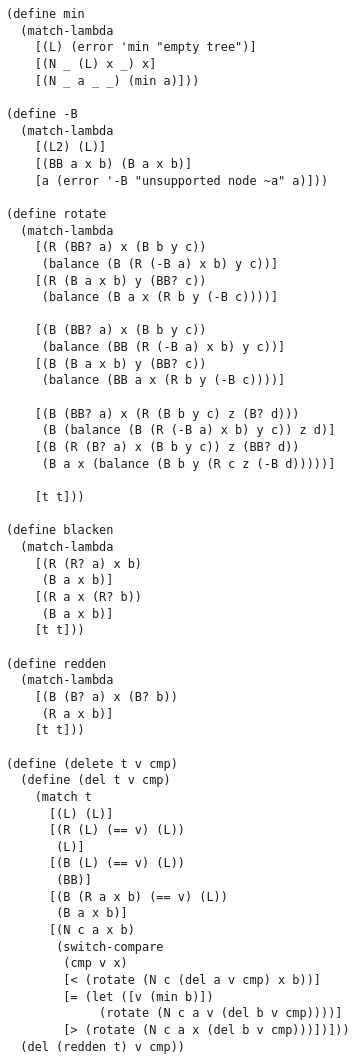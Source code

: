 \documentclass[preprint]{sigplanconf}
\begin{document}
\begin{verbatim}
(define min
  (match-lambda
    [(L) (error 'min "empty tree")]
    [(N _ (L) x _) x]
    [(N _ a _ _) (min a)]))

(define -B
  (match-lambda
    [(L2) (L)]
    [(BB a x b) (B a x b)]
    [a (error '-B "unsupported node ~a" a)]))

(define rotate
  (match-lambda
    [(R (BB? a) x (B b y c))
     (balance (B (R (-B a) x b) y c))]
    [(R (B a x b) y (BB? c))
     (balance (B a x (R b y (-B c))))]
    
    [(B (BB? a) x (B b y c))
     (balance (BB (R (-B a) x b) y c))]
    [(B (B a x b) y (BB? c))
     (balance (BB a x (R b y (-B c))))]
    
    [(B (BB? a) x (R (B b y c) z (B? d)))
     (B (balance (B (R (-B a) x b) y c)) z d)]
    [(B (R (B? a) x (B b y c)) z (BB? d))
     (B a x (balance (B b y (R c z (-B d)))))]
    
    [t t]))

(define blacken
  (match-lambda
    [(R (R? a) x b)
     (B a x b)]
    [(R a x (R? b))
     (B a x b)]
    [t t]))

(define redden
  (match-lambda
    [(B (B? a) x (B? b))
     (R a x b)]
    [t t]))

(define (delete t v cmp)
  (define (del t v cmp)
    (match t
      [(L) (L)]
      [(R (L) (== v) (L))
       (L)]
      [(B (L) (== v) (L))
       (BB)]
      [(B (R a x b) (== v) (L))
       (B a x b)]
      [(N c a x b)
       (switch-compare
        (cmp v x)
        [< (rotate (N c (del a v cmp) x b))]
        [= (let ([v (min b)])
             (rotate (N c a v (del b v cmp))))]
        [> (rotate (N c a x (del b v cmp)))])]))
  (del (redden t) v cmp))
\end{verbatim}





\end{document}
